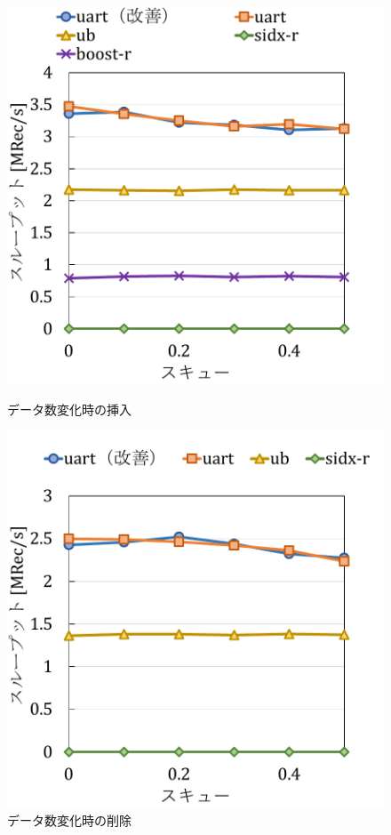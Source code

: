 \begin{figure}[tb]
  \begin{minipage}[c]{0.495\textwidth}
    \centering
    \includegraphics[scale=0.5]{./figures/graph-skew-delete-2.pdf}
    \caption{データ数変化時の挿入}
    \label{graph:grouped}
  \end{minipage}
  \begin{minipage}[c]{0.495\textwidth}
    \centering
    \includegraphics[scale=0.5]{./figures/graph-skew-delete-8.pdf}
    \caption{データ数変化時の削除}
    \label{graph:paired}
  \end{minipage}
\end{figure}

